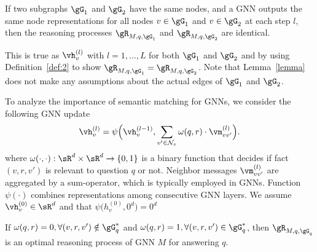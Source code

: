 \begin{lemma} \label{lemma}
If two subgraphs $\gG_1$ and $\gG_2$ have the same nodes, and a GNN  outputs the same node representations for all nodes $v \in \gG_1$ and $v \in \gG_2$ at each step $l$, then the reasoning processes $\gR_{M, q, \gG_1}$ and $\gR_{M,  q, \gG_2}$ are identical. 
\end{lemma}
\noindent
This is true as $\vh_v^{(l)}$ with $l = 1, \dots, L$ for both $\gG_1$ and $\gG_2$ and by using Definition~\ref{def:2} to show $\gR_{M, q, \gG_1} = \gR_{M,  q, \gG_2}$. Note that Lemma~\ref{lemma} does not make any assumptions about the actual edges of $\gG_1$ and $\gG_2$.


To analyze the importance of semantic matching for GNNs, we consider the following GNN update
\begin{equation}
    \vh_v^{(l)}= \psi \Big(\vh_v^{(l-1)}, \sum_{v' \in \mathcal{N}_v } \omega(q, r) \cdot \vm_{vv'}^{(l)} \Big).
    \label{eq:gnn-th-a}
\end{equation}
where $\omega(\cdot, \cdot): \sR^d \times \sR^d \xrightarrow[]{} \{0,1\}$ is a binary function that decides if fact $(v,r,v')$ is relevant to question $q$ or not. Neighbor messages $\vm_{vv'}^{(l)}$ are aggregated by a sum-operator, which is typically employed in GNNs. Function $\psi(\cdot)$ combines representations among consecutive GNN layers. We assume $\vh_v^{(0)} \in \sR^d$ and that $\psi \Big(h_v^{(0)}, 0^d \Big) = 0^d$



\begin{theorem}\label{thma-1}
If $\omega(q, r)=0 , \forall (v,r,v') \notin \gG_q^\ast$ and  $\omega(q, r) = 1 , \forall (v,r,v') \in \gG_q^\ast$, then  $\gR_{M, q, \gG_q}$ is an optimal reasoning process of GNN $M$ for answering $q$. 
\end{theorem}

